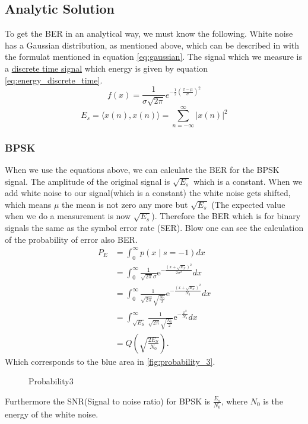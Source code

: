 \subsection{Analytic Solution}
To get the BER in an analytical way, we must know the following. White noise has a Gaussian distribution, as mentioned above, which can be described in with the formulat mentioned in equation \ref{eq:gaussian}. The signal which we measure is a \href{https://en.wikipedia.org/wiki/Energy_(signal_processing)}{discrete time signal} which energy is given by equation \ref{eq:energy_discrete_time}.
\begin{equation} \label{eq:gaussian}
f(x)=\frac{1}{\sigma \sqrt{2 \pi}} e^{-\frac{1}{2}\left(\frac{x-\mu}{\sigma}\right)^2}
\end{equation}
\begin{equation} \label{eq:energy_discrete_time}
E_s=\langle x(n), x(n)\rangle=\sum_{n=-\infty}^{\infty}|x(n)|^2
\end{equation}
\subsubsection{BPSK}
When we use the equations above, we can calculate the BER for the BPSK signal. The amplitude of the original signal is $\sqrt{E_s}$ which is a constant. When we add white noise to our signal(which is a constant) the white noise gets shifted, which means $\mu$ the mean is not zero any more but $\sqrt{E_s}$ (The expected value when we do a measurement is now $\sqrt{E_s}$). Therefore the BER which is for binary signals the same as the symbol error rate (SER). Blow one can see the calculation of the probability of error also BER.
$$
\begin{aligned}
P_E &=\int_0^{\infty} p(x \mid s=-1) d x \\
&=\int_0^{\infty} \frac{1}{\sqrt{2 \pi} \sigma} \mathrm{e}^{-\frac{\left(x+\sqrt{E_S}\right)^2}{2 \sigma^2}} d x \\
&=\int_0^{\infty} \frac{1}{\sqrt{2 \pi} \sqrt{\frac{N_0}{2}}} \mathrm{e}^{-\frac{\left(x+\sqrt{E_S}\right)^2}{N_0}} d x \\
&=\int_{\sqrt{E_S}}^{\infty} \frac{1}{\sqrt{2 \pi} \sqrt{\frac{N_0}{2}}} \mathrm{e}^{-\frac{x^2}{N_0}} d x \\
&=Q\left(\sqrt{\frac{2 E_S}{N_0}}\right) .
\end{aligned}
$$
Which corresponds to the blue area in \autoref{fig:probability_3}.
\begin{figure}[ht]
  \centering
  \caption{Probability3}
  \label{fig:probability_3}
\end{figure}
Furthermore the SNR(Signal to noise ratio) for BPSK is $\frac{E_s}{N_0}$, where $N_0$ is the energy of the white noise.
